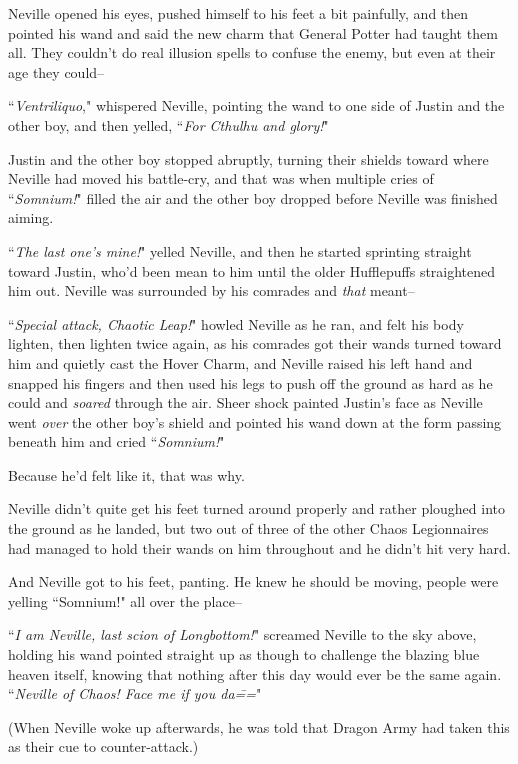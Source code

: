 Neville opened his eyes, pushed himself to his feet a bit painfully, and then pointed his wand and said the new charm that General Potter had taught them all. They couldn't do real illusion spells to confuse the enemy, but even at their age they could\---

``\emph{Ventriliquo}," whispered Neville, pointing the wand to one side of Justin and the other boy, and then yelled, ``\emph{For Cthulhu and glory!}"

Justin and the other boy stopped abruptly, turning their shields toward where Neville had moved his battle-cry, and that was when multiple cries of ``\emph{Somnium!}" filled the air and the other boy dropped before Neville was finished aiming.

``\emph{The last one's mine!}" yelled Neville, and then he started sprinting straight toward Justin, who'd been mean to him until the older Hufflepuffs straightened him out. Neville was surrounded by his comrades and \emph{that} meant\---

``\emph{Special attack, Chaotic Leap!}" howled Neville as he ran, and felt his body lighten, then lighten twice again, as his comrades got their wands turned toward him and quietly cast the Hover Charm, and Neville raised his left hand and snapped his fingers and then used his legs to push off the ground as hard as he could and \emph{soared} through the air. Sheer shock painted Justin's face as Neville went \emph{over} the other boy's shield and pointed his wand down at the form passing beneath him and cried ``\emph{Somnium!}"

Because he'd felt like it, that was why.

Neville didn't quite get his feet turned around properly and rather ploughed into the ground as he landed, but two out of three of the other Chaos Legionnaires had managed to hold their wands on him throughout and he didn't hit very hard.

And Neville got to his feet, panting. He knew he should be moving, people were yelling ``Somnium!" all over the place\---

``\emph{I am Neville, last scion of Longbottom!}" screamed Neville to the sky above, holding his wand pointed straight up as though to challenge the blazing blue heaven itself, knowing that nothing after this day would ever be the same again. ``\emph{Neville of Chaos! Face me if you da\===}"

(When Neville woke up afterwards, he was told that Dragon Army had taken this as their cue to counter-attack.)

